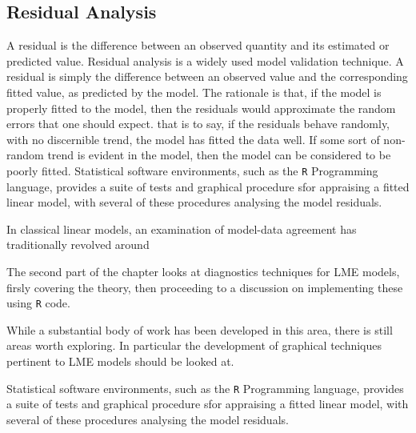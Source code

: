\documentclass[12pt, a4paper]{article}
\begin{document}
\subsection{Residual Analysis}
			A residual is the difference between an observed quantity and its
			estimated or predicted value. 
			Residual analysis is a widely used model validation technique. A residual is simply the difference between an observed value and the corresponding fitted value, as predicted by the model. The rationale is that, if the model is properly fitted to the model, then the residuals would approximate the random errors that one should expect.
			that is to say, if the residuals behave randomly, with no discernible trend, the model has fitted the data well. If some sort of non-random trend is evident in the model, then the model can be considered to be poorly fitted.
			Statistical software environments, such as the \texttt{R} Programming language, provides a suite of tests and graphical procedure sfor appraising a fitted linear model, with several 
			of these procedures analysing the model residuals.
			
			In classical linear models, an examination of model-data agreement has traditionally revolved around
			
			The second part of the chapter looks at diagnostics techniques for LME models, firsly covering the theory, then proceeding to a discussion on 
			implementing these using \texttt{R} code.
			
			While a substantial body of work has been developed in this area, there is still areas worth exploring. 
			In particular the development of graphical techniques pertinent to LME models should be looked at.
			

			
			
			Statistical software environments, such as the \texttt{R} Programming language, provides a suite of tests and graphical procedure sfor appraising a fitted linear model, with several 
			of these procedures analysing the model residuals.
			
\end{document}
